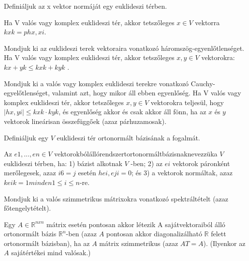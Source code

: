 \begin{frame}
  \begin{tcolorbox}[title={40}]
   Definiáljuk az x vektor normáját egy euklideszi térben.

  \tcblower
Ha V valós vagy komplex euklideszi tér, akkor tetszőleges $x \in V$ vektorra $kxk =phx,xi$.

  \end{tcolorbox}
\end{frame}


\begin{frame}
  \begin{tcolorbox}[title={41}]
     Mondjuk ki az euklideszi terek vektoraira vonatkozó háromszög-egyenlőtlenséget.
  \tcblower
Ha V valós vagy komplex euklideszi tér, akkor tetszőleges $x,y \in V$ vektorokra: $kx + yk \leq kxk + kyk$ .

  \end{tcolorbox}
\end{frame}


\begin{frame}
  \begin{tcolorbox}[title={42}]
    Mondjuk ki a valós vagy komplex euklideszi terekre vonatkozó Cauchy-egyelőtlenséget, valamint azt, hogy mikor áll ebben egyenlőség.
  \tcblower
Ha V valós vagy komplex euklideszi tér, akkor tetszőleges $x,y \in V$ vektorokra teljesül, hogy $|hx,yi| \leq kxk \cdot kyk$, és egyenlőség akkor és csak akkor áll fönn, ha az $x$ és $y$ vektorok lineárisan összefüggőek (azaz párhuzamosak).

  \end{tcolorbox}
\end{frame}


\begin{frame}
  \begin{tcolorbox}[title={43}]
    Definiáljuk egy $V$ euklideszi tér ortonormált bázisának a fogalmát.

  \tcblower
Az $e1,...,en \in V$ vektorokbólállórendszertortonormáltbázisnaknevezzüka $V$ euklideszi térben, ha: 1) bázist alkotnak $V$ -ben; 2) az $ei$ vektorok páronként merőlegesek, azaz $i 6= j$ esetén $hei,eji = 0$; és 3) a vektorok normáltak, azaz $keik = 1 minden 1 \leq i \leq n$-re. 
  \end{tcolorbox}
\end{frame}


\begin{frame}
  \begin{tcolorbox}[title={44}]
    Mondjuk ki a valós szimmetrikus mátrixokra vonatkozó spektráltételt (azaz főtengelytételt).

  \tcblower
Egy $A \in \mathbb{R}^{n x n}$ mátrix esetén pontosan akkor létezik A sajátvektoraiból álló ortonormált bázis $\mathbb{R}^n$-ben (azaz $A$ pontosan akkor diagonalizálható $\mathbb{R}$ felett ortonormált bázisban), ha az $A$ mátrix szimmetrikus (azaz $AT = A$). (Ilyenkor az $A$ sajátértékei mind valósak.)

  \end{tcolorbox}
\end{frame}


